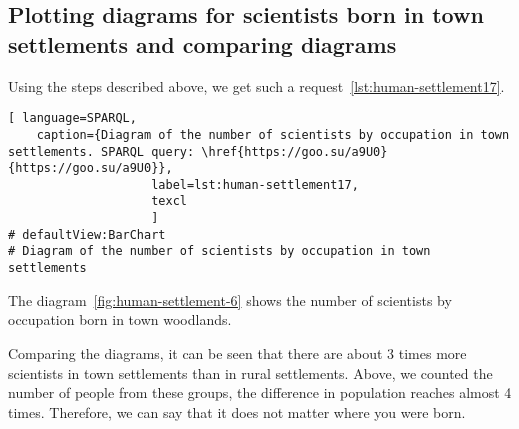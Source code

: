 \subsection{Plotting diagrams for scientists born in town settlements and comparing diagrams}

Using the steps described above, we get such a request~\ref{lst:human-settlement17}.


\begin{lstlisting}[ language=SPARQL, 
    caption={Diagram of the number of scientists by occupation in town settlements. SPARQL query: \href{https://goo.su/a9U0}{https://goo.su/a9U0}},
                    label=lst:human-settlement17,
                    texcl 
                    ]
# defaultView:BarChart
# Diagram of the number of scientists by occupation in town settlements

\end{lstlisting}%

The diagram~\ref{fig:human-settlement-6} shows the number of scientists by occupation born in town woodlands.

\begin{figure*}
    \setlength{\fboxsep}{0pt}%
    \setlength{\fboxrule}{1pt}%
	\label{fig:human-settlement-6}
	\caption[Diagram of the number of scientists by occupation in town settlements.]{Diagram of the number of scientists by occupation in town settlements. SPARQL query: \href{https://goo.su/a9U0}{https://goo.su/a9U0}}%
\end{figure*} 

Comparing the diagrams, it can be seen that there are about 3 times more scientists in town settlements than in rural settlements. Above, we counted the number of people from these groups, the difference in population reaches almost 4 times. Therefore, we can say that it does not matter where you were born.
